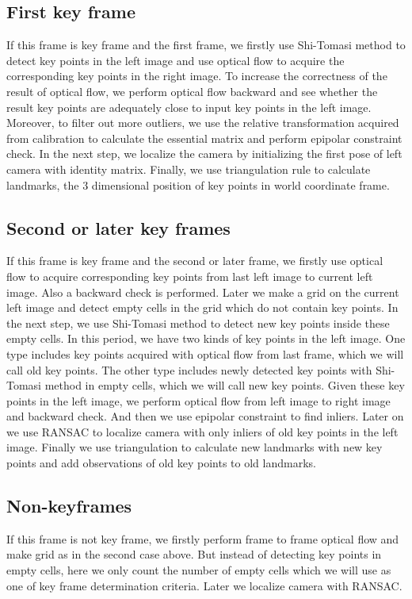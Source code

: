 \documentclass{easychair}
\begin{document}
\subsection{First key frame}
If this frame is key frame and the first frame, we firstly use Shi-Tomasi method to detect key points in the left image and use optical flow to acquire the corresponding key points in the right image. To increase the correctness of the result of optical flow, we perform optical flow backward and see whether the result key points are adequately close to input key points in the left image. Moreover, to filter out more outliers, we use the relative transformation acquired from calibration to calculate the essential matrix and perform epipolar constraint check. In the next step, we localize the camera by initializing the first pose of left camera with identity matrix. Finally, we use triangulation rule to calculate landmarks, the 3 dimensional position of key points in world coordinate frame. 

\subsection{Second or later key frames}
If this frame is key frame and the second or later frame, we firstly use optical flow to acquire corresponding key points from last left image to current left image. Also a backward check is performed. Later we make a grid on the current left image and detect empty cells in the grid which do not contain key points. In the next step, we use Shi-Tomasi method to detect new key points inside these empty cells. In this period, we have two kinds of key points in the left image. One type includes key points acquired with optical flow from last frame, which we will call old key points. The other type includes newly detected key points with Shi-Tomasi method in empty cells, which we will call new key points. Given these key points in the left image, we perform optical flow from left image to right image and backward check. And then we use epipolar constraint to find inliers. Later on we use RANSAC to localize camera with only inliers of old key points in the left image. Finally we use triangulation to calculate new landmarks with new key points and add observations of old key points to old landmarks.

\subsection{Non-keyframes}
If this frame is not key frame, we firstly perform frame to frame optical flow and make grid as in the second case above. But instead of detecting key points in empty cells, here we only count the number of empty cells which we will use as one of key frame determination criteria. Later we localize camera with RANSAC.\\
\end{document}
